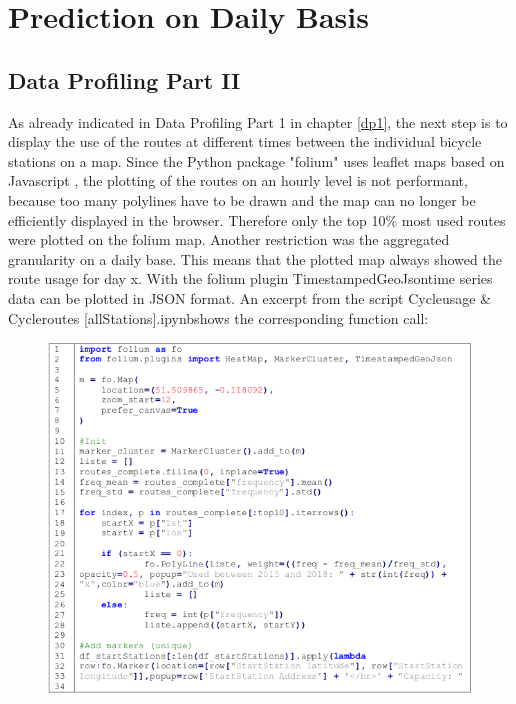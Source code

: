 \section{Prediction on Daily Basis}\label{sec:daily}
\subsection{Data Profiling Part II}\label{dp2}
As already indicated in Data Profiling Part 1 in chapter \ref{dp1}, the next step is to display the use of the routes at
different times between the individual bicycle stations on a map. Since the Python package
"folium" uses leaflet maps based on Javascript \cite{RN5}, the plotting of the routes on an hourly level is
not performant, because too many polylines have to be drawn and the map can no longer be
efficiently displayed in the browser. Therefore only the top 10\% most used routes were plotted on
the folium map. Another restriction was the aggregated granularity on a daily base. This means
that the plotted map always showed the route usage for day x. With the folium plugin
\glqq TimestampedGeoJson\grqq time series data can be plotted in JSON format. An excerpt from the
script \glqq Cycleusage \& Cycleroutes [allStations].ipynb\grqq shows the corresponding function call:
\begin{figure}[H]
\hspace{-1.6cm}
\includegraphics[width=1.2\textwidth]{img/listing1}\label{fig:listing1}
\end{figure}
